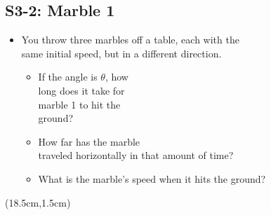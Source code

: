 \documentclass[]{article}
\begin{document}
\newpage
\begin{TeacherMargin}

\end{TeacherMargin}
\begin{PresentSpace}
\vspace{-10pt}
\section*{S3-2: Marble 1}
\vspace{-10pt}
\begin{itemize}
	\item You throw three marbles off a table, each with the \\
	same initial speed, but in a different direction.
	\vspace{10pt}
	\begin{itemize}
		\item If the angle is $\theta$, how \\
		long does it take for \\
		marble 1 to hit the \\
		ground?
		\item How far has the marble \\
		traveled horizontally in that amount of time?
		\item What is the marble's speed when it hits the ground?
	\end{itemize}
\end{itemize}
\end{PresentSpace}
\begin{textblock*}{10cm}(18.5cm,1.5cm)
	\Large
\end{textblock*}
\newpage
\begin{TeacherMargin}

\end{TeacherMargin}
\end{document}
